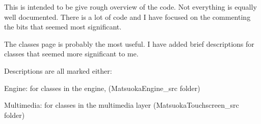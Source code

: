 This is intended to be give rough overview of the code. Not everything is equally well documented. There is a lot of code and I have focused on the commenting the bits that seemed most significant.

The classes page is probably the most useful. I have added brief descriptions for classes that seemed more significant to me.

Descriptions are all marked either\+:

Engine\+: for classes in the engine, (Matsuoka\+Engine\+\_\+src folder)

Multimedia\+: for classes in the multimedia layer (Matsuoka\+Touchscreen\+\_\+src folder) 